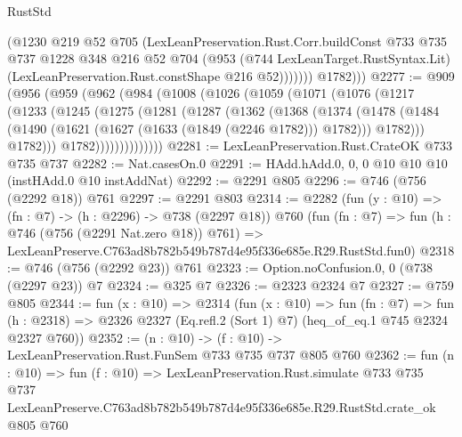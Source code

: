 \begin{lexlean}{RustStd}
\begin{coremodule}
                (@1230
                  @219
                  @52
                  @705
                  (LexLeanPreservation.Rust.Corr.buildConst
                    @733
                    @735
                    @737
                    @1228
                    @348
                    @216
                    @52
                    @704
                    (@953
                      (@744 LexLeanTarget.RustSyntax.Lit)
                      (LexLeanPreservation.Rust.constShape @216 @52)))))))
          @1782)))
@2277 := @909
    (@956
      (@959
        (@962
          (@984
            (@1008
              (@1026
                (@1059
                  (@1071
                    (@1076
                      (@1217
                        (@1233
                          (@1245
                            (@1275
                              (@1281
                                (@1287
                                  (@1362
                                    (@1368
                                      (@1374
                                        (@1478
                                          (@1484
                                            (@1490
                                              (@1621 (@1627 (@1633 (@1849 (@2246 @1782))) @1782)))
                                            @1782)))
                                      @1782)))
                                @1782))))))))))))))
@2281 := LexLeanPreservation.Rust.CrateOK @733 @735 @737
@2282 := Nat.casesOn.{0}
@2291 := HAdd.hAdd.{0, 0, 0} @10 @10 @10 (instHAdd.{0} @10 instAddNat)
@2292 := @2291 @805
@2296 := @746 (@756 (@2292 @18)) @761
@2297 := @2291 @803
@2314 := @2282
    (fun (y : @10) => (fn : @7) -> (h : @2296) -> @738 (@2297 @18))
    @760
    (fun (fn : @7) =>
    fun (h : @746 (@756 (@2291 Nat.zero @18)) @761) =>
    LexLeanPreserve.C763ad8b782b549b787d4e95f336e685e.R29.RustStd.fun0)
@2318 := @746 (@756 (@2292 @23)) @761
@2323 := Option.noConfusion.{0, 0} (@738 (@2297 @23)) @7
@2324 := @325 @7
@2326 := @2323 @2324 @7
@2327 := @759 @805
@2344 := fun (x : @10) =>
  @2314
    (fun (x : @10) =>
    fun (fn : @7) =>
    fun (h : @2318) => @2326 @2327 (Eq.refl.{2} (Sort 1) @7) (heq_of_eq.{1} @745 @2324 @2327 @760))
@2352 := (n : @10) -> (f : @10) -> LexLeanPreservation.Rust.FunSem @733 @735 @737 @805 @760
@2362 := fun (n : @10) =>
  fun (f : @10) =>
  LexLeanPreservation.Rust.simulate
    @733
    @735
    @737
    LexLeanPreserve.C763ad8b782b549b787d4e95f336e685e.R29.RustStd.crate_ok
    @805
    @760
\end{coremodule}
\end{lexlean}
